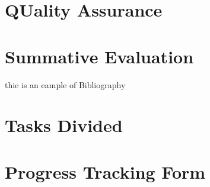 \documentclass[12pt,a4paper]{article}
\begin{document}
    \section{QUality Assurance}
    \section{Summative Evaluation}
    
    \begin{thebibliography}{2}
       thie is an eample of Bibliography
    \end{thebibliography}
    
    \begin{appendices}
      \section{Tasks Divided}
        \paragraph{}
      \section{Progress Tracking Form}

    \end{appendices}

  
\end{document}
